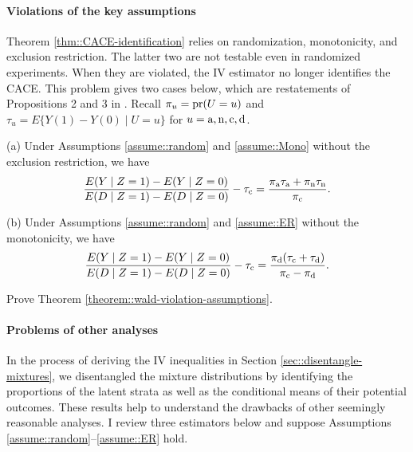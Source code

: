  
 
 \paragraph{Violations of the key assumptions}\label{eq::violations-of-IV}

Theorem \ref{thm::CACE-identification} relies on randomization, monotonicity, and exclusion restriction. The latter two are not testable even in randomized experiments. When they are violated, the IV estimator no longer identifies the CACE. This problem gives two cases below, which are restatements of  Propositions 2 and 3 in \citet{angrist1996identification}. Recall $\pi_u = \textup{pr}(U=u)$ and $\tau_u = E\{  Y(1) - Y(0) \mid U=u \}$ for $u=\textup{a}, \textup{n}, \textup{c}, \textup{d}$. 


\begin{theorem}
\label{theorem::wald-violation-assumptions}
(a) 
Under Assumptions  \ref{assume::random} and \ref{assume::Mono} without the exclusion restriction, we have
$$
\frac{ E(Y\mid Z=1) - E(Y\mid Z=0) }{ E(D\mid Z=1) - E(D \mid Z=0) } - \tau_{\textup{c}} 
= \frac{  \pi_{\textup{a}} \tau_{\textup{a}} + \pi_{\textup{n}} \tau_{\textup{n}}  }{  \pi_{\textup{c}} } .
$$
 

(b)
Under Assumptions  \ref{assume::random} and \ref{assume::ER} without the monotonicity, we have 
$$
\frac{ E(Y\mid Z=1) - E(Y\mid Z=0) }{ E(D\mid Z=1) - E(D \mid Z=0) } - \tau_{\textup{c}} 
= \frac{  \pi_{\textup{d}} (\tau_{\textup{c}} + \tau_{\textup{d}} )  }{   \pi_{\textup{c}} - \pi_{\textup{d}}   }.
$$
\end{theorem}
 
Prove Theorem \ref{theorem::wald-violation-assumptions}. 

 
 \paragraph{Problems of other analyses}\label{problem::as-treated-analysis}

In the process of deriving the IV inequalities in Section \ref{sec::disentangle-mixtures}, we disentangled the mixture distributions by identifying the proportions of the latent strata as well as the conditional means of their potential outcomes. These results help to understand the drawbacks of other seemingly reasonable analyses. I review three estimators below and suppose Assumptions \ref{assume::random}--\ref{assume::ER} hold.   


